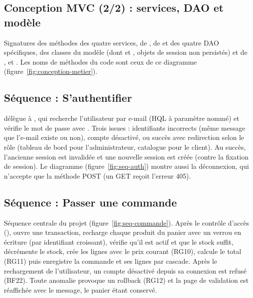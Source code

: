 \begin{landscape}
\section{Conception MVC (2/2) : services, DAO et modèle}

Signatures des méthodes des quatre services, de , de  et des quatre DAO
spécifiques, des classes du modèle (dont  et , objets de session non persistés) et de
,  et . Les noms de méthodes du code sont ceux de ce
diagramme (figure~\ref{fig:conception-metier}).

\end{landscape}

\begin{landscape}
\section{Séquence : S'authentifier}

 délègue à , qui recherche l'utilisateur par e-mail
(HQL à paramètre nommé) et vérifie le mot de passe avec . Trois issues : identifiants
incorrects (même message que l'e-mail existe ou non), compte désactivé, ou succès avec redirection selon le
rôle (tableau de bord pour l'administrateur, catalogue pour le client). Au succès, l'ancienne session est
invalidée et une nouvelle session est créée (contre la fixation de session). Le diagramme
(figure~\ref{fig:seq-auth}) montre aussi la déconnexion, qui n'accepte que la méthode POST (un GET reçoit
l'erreur 405).

\end{landscape}

\begin{landscape}
\section{Séquence : Passer une commande}

Séquence centrale du projet (figure~\ref{fig:seq-commande}). Après le contrôle d'accès (),
 ouvre une transaction, recharge chaque produit du panier avec un verrou en
écriture (par identifiant croissant), vérifie qu'il est actif et que le stock suffit, décrémente le stock, crée
les lignes avec le prix courant (RG10), calcule le total (RG11) puis enregistre la commande et ses lignes par
cascade. Après le rechargement de l'utilisateur, un compte désactivé depuis sa connexion est refusé (BF22).
Toute anomalie provoque un rollback (RG12) et la page de validation est réaffichée avec le message, le panier
étant conservé.

\end{landscape}

